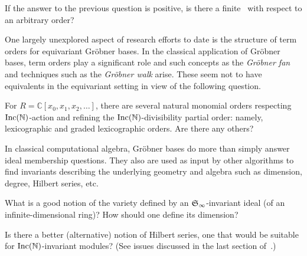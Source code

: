 \begin{question}
If the answer to the previous question is positive, is there a finite \EGB\ with respect to an arbitrary order?
\end{question}

One largely unexplored aspect of research efforts to date is the structure of term orders for equivariant Gr\"obner bases.  In the classical application of Gr\"obner bases, term orders play a significant role and such concepts as the \emph{Gr\"obner fan} and techniques such as the \emph{Gr\"obner walk} arise. These seem not to have equivalents in the equivariant setting in view of the following question.  

\begin{question} For $R = \mathbb C[x_0,x_1,x_2,\ldots]$, there are several natural monomial orders respecting $\operatorname{Inc}(\mathbb N)$-action and refining the $\operatorname{Inc}(\mathbb N)$-divisibility partial order: namely, lexicographic and graded lexicographic orders.  Are there any others?
\end{question}

In classical computational algebra, Gr\"obner bases do more than simply answer ideal membership questions.  They also are used as input by other algorithms to find invariants describing the underlying geometry and algebra such as dimension, degree, Hilbert series, etc.  

\begin{question}
What is a good notion of the variety defined by an $\mathfrak S_\infty$-invariant ideal (of an infinite-dimensional ring)? How should one define its dimension? 
\end{question}

\begin{question}
Is there a better (alternative) notion of Hilbert series, one that would be suitable for $\operatorname{Inc}(\mathbb N)$-invariant modules? 
(See issues discussed in the last section of~\cite{krone2016hilbert}.) 
\end{question}




